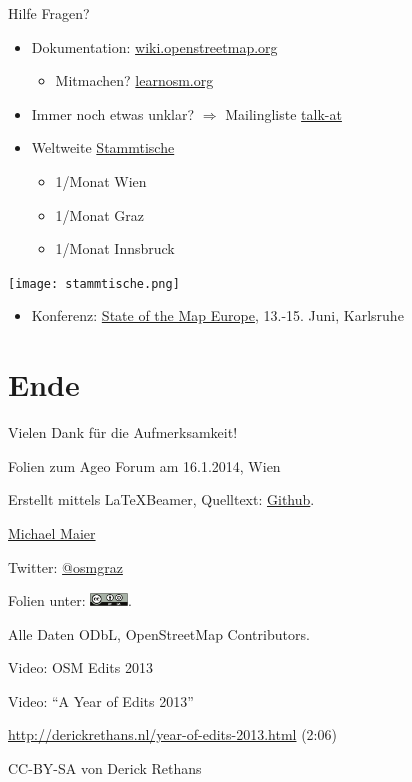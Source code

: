 \documentclass[handout]{beamer}
\begin{document}
\begin{frame}{Hilfe}
Fragen? 
\begin{itemize}
  \item Dokumentation: \href{http://wiki.openstreetmap.org}{wiki.openstreetmap.org}
  \begin{itemize} 
    \item Mitmachen? \href{http://learnosm.org/}{learnosm.org}
  \end{itemize}
  \item Immer noch etwas unklar? $\Rightarrow$ Mailingliste \href{http://lists.openstreetmap.org/listinfo/talk-at}{talk-at}
  \item Weltweite \href{http://usergroups.openstreetmap.de/}{Stammtische}
  \begin{itemize}
    \item 1/Monat Wien
    \item 1/Monat Graz
    \item 1/Monat Innsbruck
  \end{itemize}

\end{itemize}

 \vspace*{-2.0cm}
\hfill\texttt{[image: stammtische.png]}

\begin{itemize}
  \item Konferenz: \href{http://sotm-eu.org/}{State of the Map Europe}, 13.-15. Juni, Karlsruhe
\end{itemize}
\end{frame}

\section{Ende}

\begin{frame}{Vielen Dank für die Aufmerksamkeit!}

  Folien zum Ageo Forum am 16.1.2014, Wien
\vspace{1cm}

Erstellt mittels \LaTeX Beamer, Quelltext: \href{https://github.com/species/vortrag-osm-ageo}{Github}.
\vspace{1cm}

\href{mailto:michael.maier@student.tugraz.at}{Michael Maier}

Twitter: \href{https://twitter.com/osmgraz}{@osmgraz}
\vspace{1cm}

Folien unter: \includegraphics[width=1cm]{cc-by-sa.pdf}. 

Alle Daten ODbL, OpenStreetMap Contributors.

\end{frame}

\begin{frame}{Video: OSM Edits 2013}

  Video: "`A Year of Edits 2013"'

  \vspace{1cm}

\url{http://derickrethans.nl/year-of-edits-2013.html}  (2:06)

\vspace{1cm}

CC-BY-SA von Derick Rethans

\end{frame}
\end{document}
